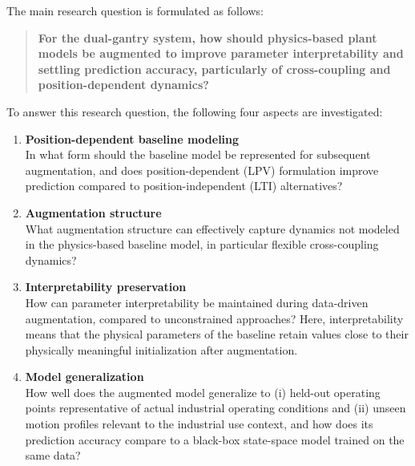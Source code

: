 \noindent The main research question is formulated as follows:
\begin{quote}
\textbf{For the dual-gantry system, how should physics-based plant models be augmented to improve parameter interpretability and settling prediction accuracy, particularly of cross-coupling and position-dependent dynamics?}
\end{quote}
\noindent To answer this research question, the following four aspects are investigated:
\begin{enumerate}[leftmargin=*, itemsep=0.3em, topsep=0.3em, parsep=0pt, partopsep=0pt]
    \item \textbf{Position-dependent baseline modeling} \\
    In what form should the baseline model be represented for subsequent augmentation, and does position-dependent (LPV) formulation improve prediction compared to position-independent (LTI) alternatives?
    \item \textbf{Augmentation structure} \\
    What augmentation structure can effectively capture dynamics not modeled in the physics-based baseline model, in particular flexible cross-coupling dynamics?
    \item \textbf{Interpretability preservation} \\
    How can parameter interpretability be maintained during data-driven augmentation, compared to unconstrained approaches? Here, interpretability means that the physical parameters of the baseline retain values close to their physically meaningful initialization after augmentation.
    \item \textbf{Model generalization} \\
    How well does the augmented model generalize to (i) held-out operating points representative of actual industrial operating conditions and (ii) unseen motion profiles relevant to the industrial use context, and how does its prediction accuracy compare to a black-box state-space model trained on the same data?
\end{enumerate}